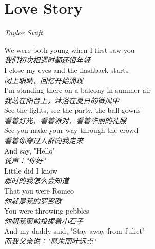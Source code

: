 \section{Love Story}

\thispagestyle{empty}


\begin{center}
\textit{Taylor Swift}
\end{center}

\vspace{1em}

\begin{spacing}{1.5}
\begin{flushleft}
We were both young when I first saw you\\
\textit{我们初次相遇时都还很年轻}\\[0.5em]

I close my eyes and the flashback starts\\
\textit{闭上眼睛，回忆开始涌现}\\[0.5em]

I'm standing there on a balcony in summer air\\
\textit{我站在阳台上，沐浴在夏日的微风中}\\[0.5em]

See the lights, see the party, the ball gowns\\
\textit{看着灯光，看着派对，看着华丽的礼服}\\[0.5em]

See you make your way through the crowd\\
\textit{看着你穿过人群向我走来}\\[0.5em]

And say, "Hello"\\
\textit{说声："你好"}\\[0.5em]

Little did I know\\
\textit{那时的我怎么会知道}\\[0.5em]

That you were Romeo\\
\textit{你就是我的罗密欧}\\[0.5em]

You were throwing pebbles\\
\textit{你朝我窗前投掷着小石子}\\[0.5em]

And my daddy said, "Stay away from Juliet"\\
\textit{而我父亲说："离朱丽叶远点"}\\[0.5em]


\end{flushleft}
\end{spacing}
